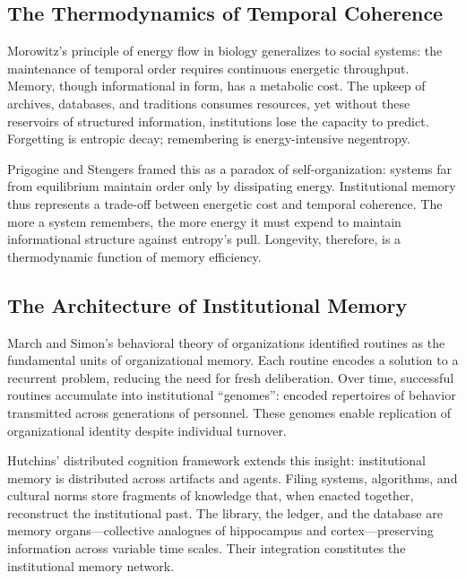 \documentclass[11pt,a4paper]{article}
\begin{document}
\subsection{The Thermodynamics of Temporal Coherence}

Morowitz’s principle of energy flow in biology \citep{Morowitz1968EnergyFlowBiology} generalizes to social systems: the maintenance of temporal order requires continuous energetic throughput.  Memory, though informational in form, has a metabolic cost.  The upkeep of archives, databases, and traditions consumes resources, yet without these reservoirs of structured information, institutions lose the capacity to predict.  Forgetting is entropic decay; remembering is energy-intensive negentropy.

Prigogine and Stengers \citep{Prigogine1977SelfOrganizationNonequilibrium} framed this as a paradox of self-organization: systems far from equilibrium maintain order only by dissipating energy.  Institutional memory thus represents a trade-off between energetic cost and temporal coherence.  The more a system remembers, the more energy it must expend to maintain informational structure against entropy’s pull.  Longevity, therefore, is a thermodynamic function of memory efficiency.

\subsection{The Architecture of Institutional Memory}

March and Simon’s behavioral theory of organizations \citep{MarchSimon1958Organizations} identified routines as the fundamental units of organizational memory.  Each routine encodes a solution to a recurrent problem, reducing the need for fresh deliberation.  Over time, successful routines accumulate into institutional “genomes”: encoded repertoires of behavior transmitted across generations of personnel.  These genomes enable replication of organizational identity despite individual turnover.

Hutchins’ distributed cognition framework \citep{Hutchins1995CognitionInTheWild} extends this insight: institutional memory is distributed across artifacts and agents.  Filing systems, algorithms, and cultural norms store fragments of knowledge that, when enacted together, reconstruct the institutional past.  The library, the ledger, and the database are memory organs—collective analogues of hippocampus and cortex—preserving information across variable time scales.  Their integration constitutes the institutional memory network.
\end{document}
